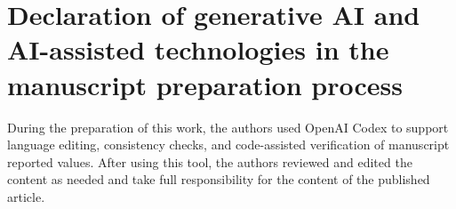 \documentclass[12pt]{article}
\begin{document}
\section*{Declaration of generative AI and AI-assisted technologies in the manuscript preparation process}

During the preparation of this work, the authors used OpenAI Codex to support language editing, consistency checks, and code-assisted verification of manuscript reported values. After using this tool, the authors reviewed and edited the content as needed and take full responsibility for the content of the published article.

\begingroup
\footnotesize
{}
\setlength{\bibsep}{0pt plus 0.3ex}


\endgroup
\end{document}
